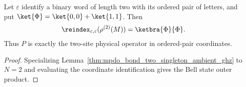 \begin{lemma}%
    \label{thm:mpdo_bond_two_singleton_bell_identity}
    \leanok
    Let $\varepsilon$ identify a binary word of length two with its ordered
    pair of letters, and put $\ket{\Phi}=\ket{0,0}+\ket{1,1}$. Then
    \begin{align}
        \reindex_{\varepsilon,\varepsilon}
        (\rho^{(2)}(M))
         & =\ketbra{\Phi}{\Phi}.
        \notag
    \end{align}
    Thus $P$ is exactly the two-site physical operator in ordered-pair
    coordinates.
\end{lemma}
\begin{proof}\leanok
    Specializing Lemma~\ref{thm:mpdo_bond_two_singleton_ambient_ghz} to
    $N=2$ and evaluating the coordinate identification gives the Bell state
    outer product.
\end{proof}

